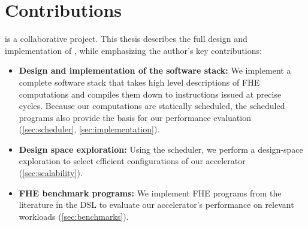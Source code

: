 \section{Contributions}

\name is a collaborative project. This thesis describes the full design and implementation of \name, while emphasizing the author's key contributions:

\begin{itemize}
\item \textbf{Design and implementation of the \name software stack:} We implement a complete software stack that takes high level descriptions of FHE computations and compiles them down to \name instructions issued at precise cycles. Because our computations are statically scheduled, the scheduled programs also provide the basis for our performance evaluation (\autoref{sec:scheduler}, \autoref{sec:implementation}).
\item \textbf{Design space exploration:} Using the \name scheduler, we perform a design-space exploration to select efficient configurations of our accelerator (\autoref{sec:scalability}).
\item \textbf{FHE benchmark programs:} We implement FHE programs from the literature in the \name DSL to evaluate our accelerator's performance on relevant workloads (\autoref{sec:benchmarks}).
\end{itemize}




